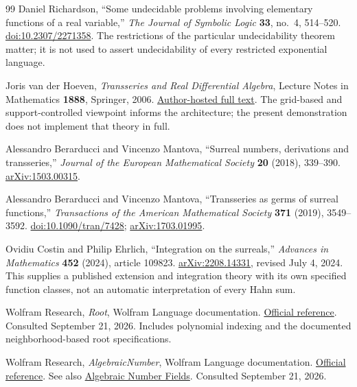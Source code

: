 \documentclass[11pt,letterpaper]{article}
\numberwithin{equation}{section}
\theoremstyle{definition}
\theoremstyle{remark}\newtheorem{remark}[theorem]{Remark}
\begin{document}
\begin{thebibliography}{99}
Daniel Richardson, ``Some undecidable problems involving elementary functions
of a real variable,'' \emph{The Journal of Symbolic Logic} \textbf{33},
no.~4, 514--520.
\href{https://doi.org/10.2307/2271358}{doi:10.2307/2271358}.
The restrictions of the particular undecidability theorem matter; it is not
used to assert undecidability of every restricted exponential language.

Joris van der Hoeven, \emph{Transseries and Real Differential Algebra},
Lecture Notes in Mathematics \textbf{1888}, Springer, 2006.
\href{https://www.texmacs.org/joris/ln/ln.html}{Author-hosted full text}.
The grid-based and support-controlled viewpoint informs the architecture;
the present demonstration does not implement that theory in full.

Alessandro Berarducci and Vincenzo Mantova, ``Surreal numbers, derivations and
transseries,'' \emph{Journal of the European Mathematical Society}
\textbf{20} (2018), 339--390.
\href{https://arxiv.org/abs/1503.00315}{arXiv:1503.00315}.

Alessandro Berarducci and Vincenzo Mantova, ``Transseries as germs of surreal
functions,'' \emph{Transactions of the American Mathematical Society}
\textbf{371} (2019), 3549--3592.
\href{https://doi.org/10.1090/tran/7428}{doi:10.1090/tran/7428};
\href{https://arxiv.org/abs/1703.01995}{arXiv:1703.01995}.

Ovidiu Costin and Philip Ehrlich, ``Integration on the surreals,''
\emph{Advances in Mathematics} \textbf{452} (2024), article 109823.
\href{https://arxiv.org/abs/2208.14331}{arXiv:2208.14331}, revised July 4, 2024.
This supplies a published extension and integration theory with its own
specified function classes, not an automatic interpretation of every Hahn sum.

Wolfram Research, \emph{Root}, Wolfram Language documentation.
\href{https://reference.wolfram.com/language/ref/Root.html}{Official reference}.
Consulted September 21, 2026. Includes polynomial indexing and the documented
neighborhood-based root specifications.

Wolfram Research, \emph{AlgebraicNumber}, Wolfram Language documentation.
\href{https://reference.wolfram.com/language/ref/AlgebraicNumber.html}{Official reference}.
See also \href{https://reference.wolfram.com/language/tutorial/AlgebraicNumberFields.html}{Algebraic Number Fields}.
Consulted September 21, 2026.


\end{thebibliography}
\end{document}
